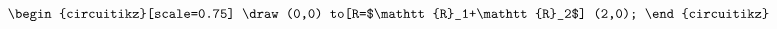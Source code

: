 \[\begin{circuitikz}[scale=0.75]
  \draw (0,0)
  to[R=$\mathtt{R}_1+\mathtt{R}_2$] (2,0);
\end{circuitikz}\]